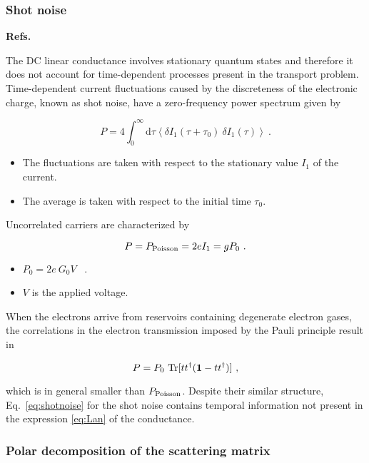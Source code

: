 \documentclass[a4paper,10pt]{article}
\newcommand{\dif}{\mathrm{d}}
\newcommand{\nin}{\noindent}
\newcommand{\be}{\begin{equation}}
\newcommand{\ee}{\end{equation}}
\begin{document}
\subsubsection{Shot noise}

{\bf Refs.~\cite{Blanter00}}

\nin The DC linear conductance involves stationary quantum states and therefore it does not account for time-dependent processes present in the transport problem. Time-dependent current fluctuations caused by the discreteness of the electronic charge, known as shot noise, have a zero-frequency power spectrum given by

\be
P = 4 \int_{0}^{\infty} \dif \tau \left\langle 
\delta I_1(\tau+\tau_0) \ \delta I_1(\tau) \right\rangle \ .
\ee

\begin{itemize}

\item The fluctuations are taken with respect to the stationary value $I_1$ of the current. 

\item The average is taken with respect to the initial time $\tau_0$. 

\end{itemize}

\nin Uncorrelated carriers are characterized by

\be
P = P_{\rm Poisson} = 2e I_1 = g P_0 \ .
\ee

\begin{itemize}

\item $P_0 = 2e \ G_0 V$ \ .

\item $V$ is the applied voltage. 

\end{itemize}

\nin When the electrons arrive from reservoirs containing degenerate electron gases, the correlations in the electron transmission imposed by the Pauli principle result in \cite{Buttiker}

\be
P=P_{0} \ \mathrm{Tr}[tt^{\dagger}({\bf 1}-tt^{\dagger})] \ ,
\label{eq:shotnoise}
\ee 
 
\nin which is in general smaller than $P_{\rm Poisson}$. Despite their similar structure, Eq.~\eqref{eq:shotnoise} for the shot noise contains temporal information not present in the expression \eqref{eq:Lan} of the conductance. 
   
\subsubsection{Polar decomposition of the scattering matrix}
\end{document}
